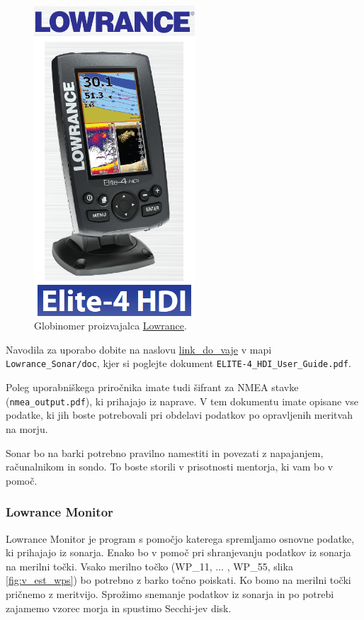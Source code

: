 \documentclass[11pt]{article}
\begin{document}
\begin{figure}[!h]
	\centering \includegraphics[width=6cm]{figs/ES.png}
	\caption{Globinomer proizvajalca \href{http://www.lowrance.com}{Lowrance}.}
	\label{fig:v_est_es}
\end{figure}

\noindent
Navodila za uporabo dobite na naslovu \href{https://drive.google.com/open?id=0B1dT-CBA07ANQU9sOU96MDJ5b2M}{link\_do\_vaje} v mapi \texttt{Lowrance\_Sonar/doc}, kjer si poglejte dokument \texttt{ELITE-4\_HDI\_User\_Guide.pdf}.

\noindent
Poleg uporabniškega priročnika imate tudi šifrant za NMEA stavke (\texttt{nmea\_output.pdf}), ki prihajajo iz naprave. V tem dokumentu imate opisane vse podatke, ki jih boste potrebovali pri obdelavi podatkov po opravljenih meritvah na morju.

\noindent
Sonar bo na barki potrebno pravilno namestiti in povezati z napajanjem, računalnikom in sondo. To boste storili v prisotnosti mentorja, ki vam bo v pomoč.

\subsubsection{Lowrance Monitor}
Lowrance Monitor je program s pomočjo katerega spremljamo osnovne podatke, ki prihajajo iz sonarja. Enako bo v pomoč pri shranjevanju podatkov iz sonarja na merilni točki. Vsako merilno točko (WP\_11, $\ldots$ , WP\_55, slika \ref{fig:v_est_wps}) bo potrebno z barko točno poiskati. Ko bomo na merilni točki pričnemo z meritvijo. Sprožimo snemanje podatkov iz sonarja in po potrebi zajamemo vzorec morja in spustimo Secchi-jev disk.
\end{document}
